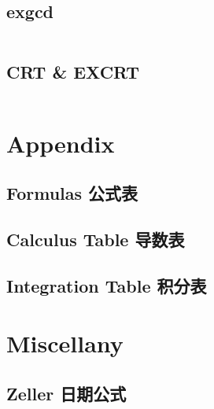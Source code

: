 \documentclass[titlepage, a4paper]{article}
\begin{document}
\begin{multicols}{2}
\begin{spacing}{0.6}
				\subsection{exgcd}
					\inputminted{cpp}{src/Math Combinatorics/exgcd.cpp}
				\subsection{CRT \& EXCRT} 
					\inputminted{cpp}{src/Math Combinatorics/CRT.cpp}

			\section{Appendix}
				\begin{spacing}{0.5}
				\subsection{Formulas 公式表}
					
				\subsection{Calculus Table 导数表}
					
				\subsection{Integration Table 积分表}
					
				\end{spacing}
			\section{Miscellany}
				\subsection{Zeller 日期公式}
					\inputminted{cpp}{src/Miscellany/日期公式.cpp}

\end{spacing}
\end{multicols}
\end{document}
